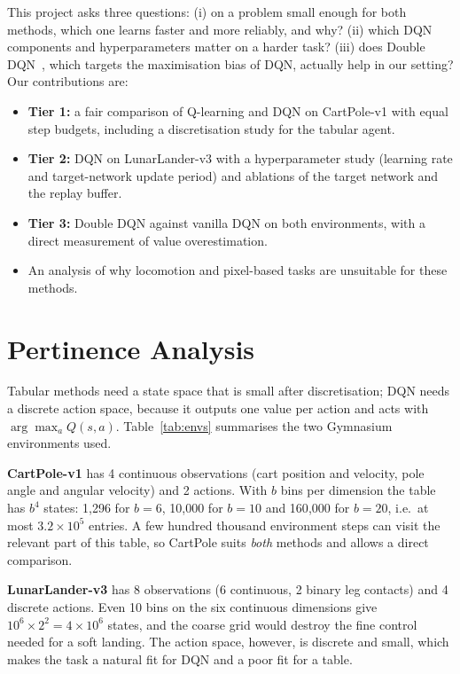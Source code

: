 \documentclass[10pt,twocolumn,letterpaper]{article}
\begin{document}
This project asks three questions: (i) on a problem small enough for both methods, which one learns faster and more reliably, and why? (ii) which DQN components and hyperparameters matter on a harder task? (iii) does Double DQN~\cite{vanhasselt2016}, which targets the maximisation bias of DQN, actually help in our setting? Our contributions are:
\begin{itemize}
  \item \textbf{Tier 1:} a fair comparison of Q-learning and DQN on CartPole-v1 with equal step budgets, including a discretisation study for the tabular agent.
  \item \textbf{Tier 2:} DQN on LunarLander-v3 with a hyperparameter study (learning rate and target-network update period) and ablations of the target network and the replay buffer.
  \item \textbf{Tier 3:} Double DQN against vanilla DQN on both environments, with a direct measurement of value overestimation.
  \item An analysis of why locomotion and pixel-based tasks are unsuitable for these methods.
\end{itemize}

\section{Pertinence Analysis}
\label{sec:pertinence}

Tabular methods need a state space that is small after discretisation; DQN needs a discrete action space, because it outputs one value per action and acts with $\arg\max_a Q(s,a)$. Table~\ref{tab:envs} summarises the two Gymnasium~\cite{towers2024} environments used.

\textbf{CartPole-v1} has 4 continuous observations (cart position and velocity, pole angle and angular velocity) and 2 actions. With $b$ bins per dimension the table has $b^4$ states: 1{,}296 for $b=6$, 10{,}000 for $b=10$ and 160{,}000 for $b=20$, i.e.\ at most $3.2\times10^5$ entries. A few hundred thousand environment steps can visit the relevant part of this table, so CartPole suits \emph{both} methods and allows a direct comparison.

\textbf{LunarLander-v3} has 8 observations (6 continuous, 2 binary leg contacts) and 4 discrete actions. Even 10 bins on the six continuous dimensions give $10^6\times 2^2=4\times10^6$ states, and the coarse grid would destroy the fine control needed for a soft landing. The action space, however, is discrete and small, which makes the task a natural fit for DQN and a poor fit for a table.
\end{document}

